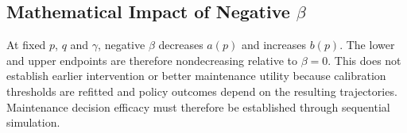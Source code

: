 \subsection*{Mathematical Impact of Negative $\beta$}
At fixed $p$, $q$ and $\gamma$, negative $\beta$ decreases $a(p)$ and increases $b(p)$. The lower and upper endpoints are therefore nondecreasing relative to $\beta=0$. This does not establish earlier intervention or better maintenance utility because calibration thresholds are refitted and policy outcomes depend on the resulting trajectories. Maintenance decision efficacy must therefore be established through sequential simulation.
